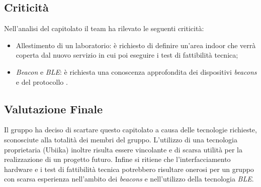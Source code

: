   
\subsection{Criticità}
Nell'analisi del capitolato il team ha rilevato le seguenti criticità:
\begin{itemize} 
\item Allestimento di un laboratorio: è richiesto di definire un'area indoor che verrà coperta dal nuovo servizio in cui poi eseguire i test di fattibilità tecnica;
\item \textit{Beacon} e \textit{BLE}: è richiesta una conoscenza approfondita dei dispositivi \textit{beacons} e del protocollo .
\end{itemize}


\subsection{Valutazione Finale}
Il gruppo ha deciso di scartare questo capitolato a causa delle tecnologie richieste, sconosciute alla totalità dei membri del gruppo. L'utilizzo di una tecnologia proprietaria (Ubiika) inoltre risulta essere vincolante e di scarsa utilità per la realizzazione di un progetto futuro. Infine si ritiene che l'interfacciamento hardware e i test di fattibilità tecnica potrebbero risultare onerosi per un gruppo con scarsa esperienza nell'ambito dei \textit{beacons} e nell'utilizzo della tecnologia \textit{BLE}.  
